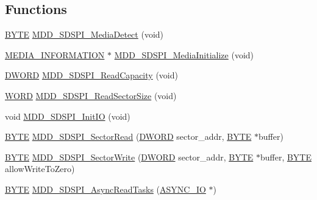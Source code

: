 \subsection*{Functions}
\begin{DoxyCompactItemize}
\item 
\hyperlink{_generic_type_defs_8h_a4ae1dab0fb4b072a66584546209e7d58}{B\+Y\+T\+E} \hyperlink{_s_d-_s_p_i_8h_a30887940b056f7563f2c31cfdc9b9527}{M\+D\+D\+\_\+\+S\+D\+S\+P\+I\+\_\+\+Media\+Detect} (void)
\item 
\hyperlink{struct_m_e_d_i_a___i_n_f_o_r_m_a_t_i_o_n}{M\+E\+D\+I\+A\+\_\+\+I\+N\+F\+O\+R\+M\+A\+T\+I\+O\+N} $\ast$ \hyperlink{_s_d-_s_p_i_8h_a9c7c30de788025bb1713976e6de55254}{M\+D\+D\+\_\+\+S\+D\+S\+P\+I\+\_\+\+Media\+Initialize} (void)
\item 
\hyperlink{_generic_type_defs_8h_ad342ac907eb044443153a22f964bf0af}{D\+W\+O\+R\+D} \hyperlink{_s_d-_s_p_i_8h_abf7ff1b0a96625e8108c47957de8d46d}{M\+D\+D\+\_\+\+S\+D\+S\+P\+I\+\_\+\+Read\+Capacity} (void)
\item 
\hyperlink{_generic_type_defs_8h_a2b0e863dadf920709ec53d9088ee7c91}{W\+O\+R\+D} \hyperlink{_s_d-_s_p_i_8h_a20a071eb0f4d5fdcd574d4c359686d71}{M\+D\+D\+\_\+\+S\+D\+S\+P\+I\+\_\+\+Read\+Sector\+Size} (void)
\item 
void \hyperlink{_s_d-_s_p_i_8h_aa57c9a50f2928e5fa73b694820d0b9ee}{M\+D\+D\+\_\+\+S\+D\+S\+P\+I\+\_\+\+Init\+I\+O} (void)
\item 
\hyperlink{_generic_type_defs_8h_a4ae1dab0fb4b072a66584546209e7d58}{B\+Y\+T\+E} \hyperlink{_s_d-_s_p_i_8h_a36e18542755f672a02b549ba9d9a5b3d}{M\+D\+D\+\_\+\+S\+D\+S\+P\+I\+\_\+\+Sector\+Read} (\hyperlink{_generic_type_defs_8h_ad342ac907eb044443153a22f964bf0af}{D\+W\+O\+R\+D} sector\+\_\+addr, \hyperlink{_generic_type_defs_8h_a4ae1dab0fb4b072a66584546209e7d58}{B\+Y\+T\+E} $\ast$buffer)
\item 
\hyperlink{_generic_type_defs_8h_a4ae1dab0fb4b072a66584546209e7d58}{B\+Y\+T\+E} \hyperlink{_s_d-_s_p_i_8h_a1d6db29d5e24aebec87110db1ca5823d}{M\+D\+D\+\_\+\+S\+D\+S\+P\+I\+\_\+\+Sector\+Write} (\hyperlink{_generic_type_defs_8h_ad342ac907eb044443153a22f964bf0af}{D\+W\+O\+R\+D} sector\+\_\+addr, \hyperlink{_generic_type_defs_8h_a4ae1dab0fb4b072a66584546209e7d58}{B\+Y\+T\+E} $\ast$buffer, \hyperlink{_generic_type_defs_8h_a4ae1dab0fb4b072a66584546209e7d58}{B\+Y\+T\+E} allow\+Write\+To\+Zero)
\item 
\hyperlink{_generic_type_defs_8h_a4ae1dab0fb4b072a66584546209e7d58}{B\+Y\+T\+E} \hyperlink{_s_d-_s_p_i_8h_a52bd91eb718c428e95c044d9a5d2086c}{M\+D\+D\+\_\+\+S\+D\+S\+P\+I\+\_\+\+Async\+Read\+Tasks} (\hyperlink{struct_a_s_y_n_c___i_o}{A\+S\+Y\+N\+C\+\_\+\+I\+O} $\ast$)

\end{DoxyCompactItemize}
